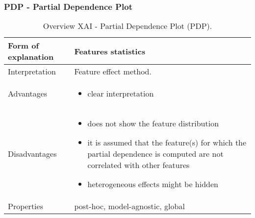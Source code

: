 \subsubsection{PDP - Partial Dependence Plot}
\begin{table}[H]
  \centering
  \begin{tabular}{|p{}|p{}|}
    \hline
    Form of \newline explanation & 
    Features statistics \\
    
    \hline
    Interpretation & 
    Feature effect method.\\
    \hline
    Advantages &
    \begin{itemize}[nosep, left=0em]
        \item clear interpretation
    \end{itemize} \\
    
    \hline
    Disadvantages &
    \begin{itemize}[nosep, left=0em]
        \item does not show the feature distribution
        \item it is assumed that the feature(s) for which the partial dependence is computed are not correlated with other features
        \item heterogeneous effects might be hidden
    \end{itemize} \\
    
    \hline
    Properties & 
    post-hoc, model-agnostic, global  \\
    
    \hline
  \end{tabular}
  \caption{Overview XAI - Partial Dependence Plot (PDP).}
  \label{tab:XAIPDP}
\end{table}

